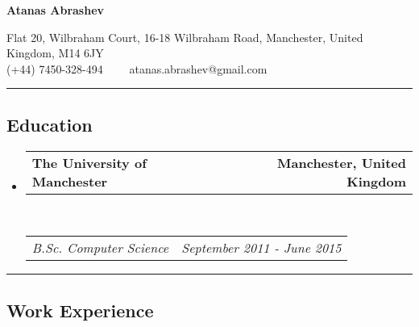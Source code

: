 \documentclass[10pt,letterpaper]{article}
\makeatletter
\newcommand{\headerrow}[2]
{\begin{tabular*}{\linewidth}{l@{\extracolsep{\fill}}r}
    #1 &
    #2 \\
\end{tabular*}}
\makeatother
\begin{document}
\begin{center}
{\LARGE \textbf{Atanas Abrashev}}

Flat 20, Wilbraham Court,
16-18 Wilbraham Road,
Manchester, United Kingdom,
M14 6JY
\\
(+44) 7450-328-494\ \ \textbullet
\ \ atanas.abrashev@gmail.com
\end{center}

\hrule
\vspace{-0.4em}
\subsection*{Education}

\begin{itemize}
    \parskip=0.1em

    \item
    \headerrow
        {\textbf{The University of Manchester}}
        {\textbf{Manchester, United Kingdom}}
    \\
    \headerrow
        {\emph{B.Sc. Computer Science}}
        {\emph{September 2011 - June 2015}}

\end{itemize}



\hrule
\vspace{-0.4em}
\subsection*{Work Experience}
\end{document}
